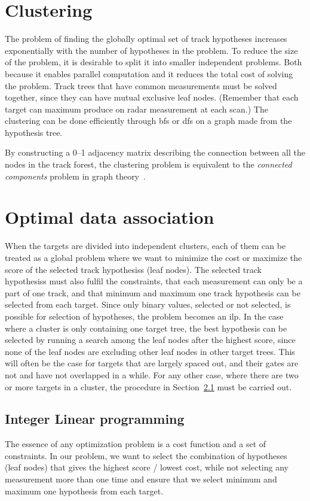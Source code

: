 \section{Clustering}
The problem of finding the globally optimal set of track hypotheses increases exponentially with the number of hypotheses in the problem. To reduce the size of the problem, it is desirable to split it into smaller independent problems. Both because it enables parallel computation and it reduces the total cost of solving the problem. Track trees that have common measurements must be solved together, since they can have mutual exclusive leaf nodes. (Remember that each target can maximum produce on radar measurement at each scan.) The clustering can be done efficiently through \gls{bfs} or \gls{dfs} on a graph made from the hypothesis tree.

By constructing a 0--1 adjacency matrix describing the connection between all the nodes in the track forest, the clustering problem is equivalent to the \emph{connected components} problem in graph theory~\cite{Chen2015}.

\section{Optimal data association}
When the targets are divided into independent clusters, each of them can be treated as a global problem where we want to minimize the cost or maximize the score of the selected \glspl{track hypothesis} (leaf nodes). The selected \glspl{track hypothesis} must also fulfil the constraints, that each measurement can only be a part of one track, and that minimum and maximum one track hypothesis can be selected from each target. Since only binary values, selected or not selected, is possible for selection of hypotheses, the problem becomes an \gls{ilp}. In the case where a cluster is only containing one target tree, the best hypothesis can be selected by running a search among the leaf nodes after the highest score, since none of the leaf nodes are excluding other leaf nodes in other target trees. This will often be the case for targets that are largely spaced out, and their gates are not and have not overlapped in a while. For any other case, where there are two or more targets in a cluster, the procedure in Section~\ref{subsec:integer_linear_programming} must be carried out. 

\subsection{Integer Linear programming}\label{subsec:integer_linear_programming}
The essence of any optimization problem is a cost function and a set of constraints. In our problem, we want to select the combination of hypotheses (leaf nodes) that gives the highest score / lowest cost, while not selecting any measurement more than one time and ensure that we select minimum and maximum one hypothesis from each target.


